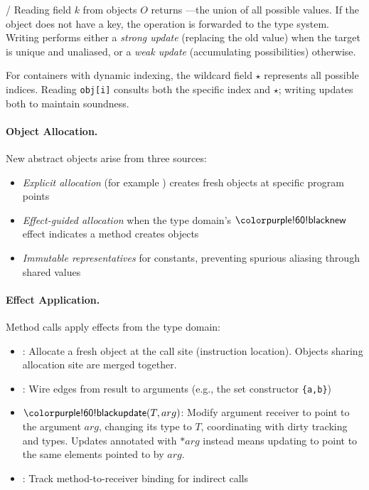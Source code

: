 \tGetAttr/\tSetAttr
Reading field $k$ from objects $O$ returns ---the union of all possible values. If the object does not have a key, the operation is forwarded to the type system. Writing performs either a \emph{strong update} (replacing the old value) when the target is unique and unaliased, or a \emph{weak update} (accumulating possibilities) otherwise.

For containers with dynamic indexing, the wildcard field $\star$ represents all possible indices. Reading \texttt{obj[i]} consults both the specific index and $\star$; writing updates both to maintain soundness.

\paragraph{Object Allocation.}
New abstract objects arise from three sources:
\begin{itemize}
\item \emph{Explicit allocation} (for example \tBind) creates fresh objects at specific program points
\item \emph{Effect-guided allocation} when the type domain's $\tnew$ effect indicates a method creates objects  
\item \emph{Immutable representatives} for constants, preventing spurious aliasing through shared values
\end{itemize}

\paragraph{Effect Application.}
Method calls apply effects from the type domain:
\begin{itemize}
\item \tnew: Allocate a fresh object at the call site (instruction location). Objects sharing allocation site are merged together.
\item \tptstoargs: Wire edges from result to arguments (e.g., the set constructor \texttt{\{a,b\}})
\item $\tupdate(T, arg)$: Modify argument receiver to point to the argument $arg$, changing its type to $T$, coordinating with dirty tracking and types. Updates annotated with $*arg$ instead means updating to point to the same elements pointed to by $arg$. 
\item \tboundmeth: Track method-to-receiver binding for indirect calls
\end{itemize}

